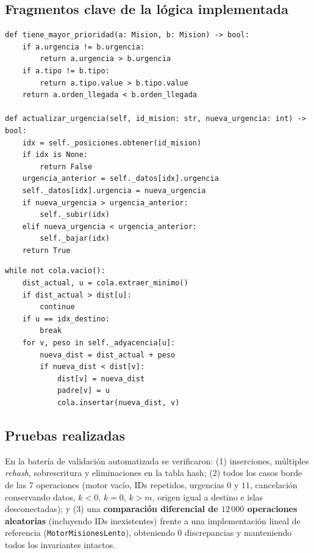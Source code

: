 \documentclass[11pt,a4paper]{article}
\begin{document}
\subsection{Fragmentos clave de la lógica implementada}

\begin{lstlisting}[caption={Regla de desempate y actualizaci\'on de urgencia en el m\'odulo de prioridades.}]
def tiene_mayor_prioridad(a: Mision, b: Mision) -> bool:
    if a.urgencia != b.urgencia:
        return a.urgencia > b.urgencia
    if a.tipo != b.tipo:
        return a.tipo.value > b.tipo.value
    return a.orden_llegada < b.orden_llegada

def actualizar_urgencia(self, id_mision: str, nueva_urgencia: int) -> bool:
    idx = self._posiciones.obtener(id_mision)
    if idx is None:
        return False
    urgencia_anterior = self._datos[idx].urgencia
    self._datos[idx].urgencia = nueva_urgencia
    if nueva_urgencia > urgencia_anterior:
        self._subir(idx)
    elif nueva_urgencia < urgencia_anterior:
        self._bajar(idx)
    return True
\end{lstlisting}

\begin{lstlisting}[caption={N\'ucleo del algoritmo de Dijkstra con Min-Heap binario propio.}]
while not cola.vacio():
    dist_actual, u = cola.extraer_minimo()
    if dist_actual > dist[u]:
        continue
    if u == idx_destino:
        break
    for v, peso in self._adyacencia[u]:
        nueva_dist = dist_actual + peso
        if nueva_dist < dist[v]:
            dist[v] = nueva_dist
            padre[v] = u
            cola.insertar(nueva_dist, v)
\end{lstlisting}

\subsection{Pruebas realizadas}
En la batería de validación automatizada se verificaron: (1) inserciones, múltiples \textit{rehash}, sobrescritura y eliminaciones en la tabla hash; (2) todos los casos borde de las 7 operaciones (motor vacío, IDs repetidos, urgencias $0$ y $11$, cancelación conservando datos, $k < 0$, $k = 0$, $k > m$, origen igual a destino e islas desconectadas); y (3) una \textbf{comparación diferencial de $12\,000$ operaciones aleatorias} (incluyendo IDs inexistentes) frente a una implementación lineal de referencia (\texttt{MotorMisionesLento}), obteniendo $0$ discrepancias y manteniendo todos los invariantes intactos.
\end{document}
